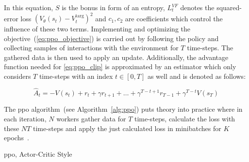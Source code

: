 \documentclass[draft,final]{vutinfth} %
\newcommand{\pautoref}[1]{(\autoref{#1})}
\newcommand{\p}[1]{see p. #1}
\begin{document}
    In this equation, $S$ is the bonus in form of an entropy, $L_t^{VF}$ denotes the squared-error loss $(V_\theta(s_t)-V_t^{\text{targ}})^2$ and $c_1,c_2$ are coefficients which control the influence of these two terms.
    Implementing and optimizing the objective~\pautoref{eq:ppo_objective} is carried out by following the policy and collecting samples of interactions with the environment for $T$ time-steps.
    The gathered data is then used to apply an update.
    Additionally, the advantage function needed for \autoref{eq:ppo_clip} is approximated by an estimator which only considers $T$ time-steps with an index $t\in [0,T]$ as well and is denoted as follows:

    \begin{equation}
        \hat{A}_t=-V(s_t)+r_t+\gamma r_{t+1} + \dots + \gamma^{T-t+1}r_{T-1} + \gamma^{T-t}V(s_T)\label{eq:advantage_estimator}
    \end{equation}

    The \gls{ppo} algorithm~(see Algorithm~\ref{alg:ppo}) puts theory into practice where in each iteration, $N$ workers gather data for $T$ time-steps, calculate the loss with these $NT$ time-steps and apply the just calculated loss in minibatches for $K$ epochs~\citep{francois-lavet_introduction_2018}.
    \newpage
    \begin{algorithm}
        \caption[\acrlong{ppo}, Actor-Critic Style]{\gls{ppo}, Actor-Critic Style\protect\footnotemark}
        \label{alg:ppo}




    \end{algorithm}

    \footnotetext{\citep[\p{5}]{schulman_proximal_2017}}

    \glsresetall
\end{document}
